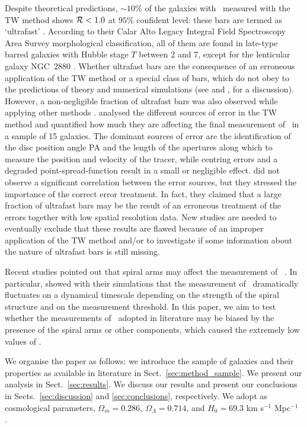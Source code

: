 \documentclass{aa}
\begin{document}
Despite theoretical predictions, $\sim10\%$ of the galaxies with \omegabar\ measured with the TW method shows ${\cal R} < 1.0$ at $95\%$ confident level: these bars are termed as `ultrafast' \citep{Buta2009}. According to their Calar Alto Legacy Integral Field Spectroscopy Area Survey \citep[CALIFA;][]{sanchez2012,Walcher2014,FalconBarroso2017} morphological classification, all of them are found in late-type barred galaxies with Hubble stage $T$ between 2 and 7, except for the lenticular galaxy NGC~2880 \citep{Cuomo2020}. Whether ultrafast bars are the consequence of an erroneous application of the TW method or a special class of bars, which do not obey to the predictions of theory and numerical simulations (see \citealt{Aguerri2015} and \citealt{Guo2019}, for a discussion). However, a non-negligible fraction of ultrafast bars was also observed while applying other methods \citep{Buta2009,Buta2017}. \citet{Garma-Oehmichen2020} analysed the different sources of error in the TW method and quantified how much they are affecting the final measurement of \omegabar\ in a sample of 15 galaxies. The dominant sources of error are the identification of the disc position angle PA and the length of the apertures along which to measure the position and velocity of the tracer, while centring errors and a degraded point-spread-function result in a small or negligible effect. \cite{Garma-Oehmichen2020} did not observe a significant correlation between the error sources, but they stressed the importance of the correct error treatment. In fact, they claimed that a large fraction of ultrafast bars may be the result of an erroneous treatment of the errors together with low spatial resolution data. New studies are needed to eventually exclude that these results are flawed because of an improper application of the TW method and/or to investigate if some information about the nature of ultrafast bars is still missing. 

Recent studies pointed out that spiral arms may affect the measurement of \rbar\ \citep{Petersen2019,Hilmi2020}. In particular, \citet{Hilmi2020} showed with their simulations that the measurement of \rbar\ dramatically fluctuates on a dynamical timescale depending on the strength of the spiral structure and on the measurement threshold. In this paper, we aim to test whether the measurements of \rbar\ adopted in literature may be biased by the presence of the spiral arms or other components, which caused the extremely low values of \rr. 

We organise the paper as follows: we introduce the sample of galaxies and their properties as available in literature in Sect.~\ref{sec:method_sample}. We present our analysis in Sect.~\ref{sec:results}. We discuss our results and present our conclusions in Sects.~\ref{sec:discussion} and \ref{sec:conclusions}, respectively. We adopt as cosmological parameters, $\Omega_m = 0.286,~\Omega_\Lambda = 0.714$, and $H_0 = 69.3$ km s$^{-1}$ Mpc$^{-1}$ \citep{Hinshaw2013}.
\end{document}

